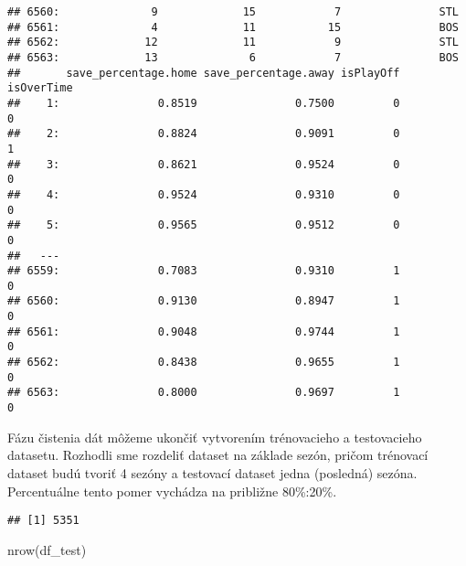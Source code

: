\documentclass[
]{article}
\newenvironment{Shaded}{\begin{snugshade}}{\end{snugshade}}
\newcommand{\FunctionTok}[1]{\textcolor[rgb]{0.00,0.00,0.00}{#1}}
\newcommand{\NormalTok}[1]{#1}
\newcommand{\OtherTok}[1]{\textcolor[rgb]{0.56,0.35,0.01}{#1}}
\newcommand{\SpecialCharTok}[1]{\textcolor[rgb]{0.00,0.00,0.00}{#1}}
\newcommand{\StringTok}[1]{\textcolor[rgb]{0.31,0.60,0.02}{#1}}
\begin{document}
\begin{verbatim}
## 6560:              9             15            7               STL
## 6561:              4             11           15               BOS
## 6562:             12             11            9               STL
## 6563:             13              6            7               BOS
##       save_percentage.home save_percentage.away isPlayOff isOverTime
##    1:               0.8519               0.7500         0          0
##    2:               0.8824               0.9091         0          1
##    3:               0.8621               0.9524         0          0
##    4:               0.9524               0.9310         0          0
##    5:               0.9565               0.9512         0          0
##   ---                                                               
## 6559:               0.7083               0.9310         1          0
## 6560:               0.9130               0.8947         1          0
## 6561:               0.9048               0.9744         1          0
## 6562:               0.8438               0.9655         1          0
## 6563:               0.8000               0.9697         1          0
\end{verbatim}

Fázu čistenia dát môžeme ukončiť vytvorením trénovacieho a testovacieho
datasetu. Rozhodli sme rozdeliť dataset na základe sezón, pričom
trénovací dataset budú tvoriť 4 sezóny a testovací dataset jedna
(posledná) sezóna. Percentuálne tento pomer vychádza na približne
80\%:20\%.

\begin{Shaded}
\end{Shaded}

\begin{verbatim}
## [1] 5351
\end{verbatim}

\begin{Shaded}
\begin{Highlighting}[]
\FunctionTok{nrow}\NormalTok{(df\_test)}
\end{Highlighting}
\end{Shaded}
\end{document}
